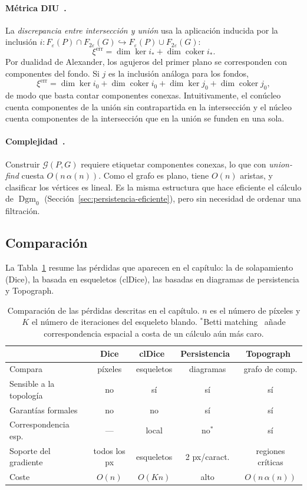 \paragraph{Métrica DIU~\cite[§2.5]{lux2025}.} La \emph{discrepancia entre
intersección y unión} usa la aplicación inducida por la inclusión
$i:F_\varepsilon(P)\cap F_{2\varepsilon}(G)\hookrightarrow
F_\varepsilon(P)\cup F_{2\varepsilon}(G)$:
\[
  \xi^{\mathrm{err}}=\dim\ker i_*+\dim\operatorname{coker} i_*.
\]
Por dualidad de Alexander, los agujeros del primer plano se corresponden
con componentes del fondo. Si $j$ es la inclusión análoga para los fondos,
\[
  \xi^{\mathrm{err}}=\dim\ker i_0+\dim\operatorname{coker} i_0
                    +\dim\ker j_0+\dim\operatorname{coker} j_0,
\]
de modo que basta contar componentes conexas. Intuitivamente, el
conúcleo cuenta componentes de la unión sin contrapartida en la
intersección y el núcleo cuenta componentes de la intersección que en la
unión se funden en una sola.

\paragraph{Complejidad~\cite[§2.6]{lux2025}.} Construir $\mathcal{G}(P,G)$
requiere etiquetar componentes conexas, lo que con \emph{union-find} cuesta
$O(n\,\alpha(n))$. Como el grafo es plano, tiene $O(n)$ aristas, y
clasificar los vértices es lineal. Es la misma estructura que hace eficiente
el cálculo de $\operatorname{Dgm}_0$
(Sección~\ref{sec:persistencia-eficiente}), pero sin necesidad de ordenar
una filtración.

\subsection{Comparación}

La Tabla~\ref{tab:comparacion-topo} resume las pérdidas que aparecen en el
capítulo: la de solapamiento (Dice), la basada en esqueletos (clDice), las
basadas en diagramas de persistencia y Topograph.

\begin{table}[ht]
\centering
\small
\begin{tabular}{@{}lcccc@{}}
\toprule
 & Dice & clDice~\cite{shit2021} & Persistencia~\cite{hu2019,stucki2023} & Topograph~\cite{lux2025}\\
\midrule
Compara & píxeles & esqueletos & diagramas & grafo de comp.\\
Sensible a la topología & no & sí & sí & sí\\
Garantías formales & no & no & sí & sí\\
Correspondencia esp. & --- & local & no$^{*}$ & sí\\
Soporte del gradiente & todos los px & esqueletos & 2 px/caract. & regiones críticas\\
Coste & $O(n)$ & $O(Kn)$ & alto & $O(n\,\alpha(n))$\\
\bottomrule
\end{tabular}
\caption{Comparación de las pérdidas descritas en el capítulo. $n$ es el
número de píxeles y $K$ el número de iteraciones del esqueleto blando.
$^{*}$Betti matching~\cite{stucki2023} añade correspondencia espacial a
costa de un cálculo aún más caro.}
\label{tab:comparacion-topo}
\end{table}